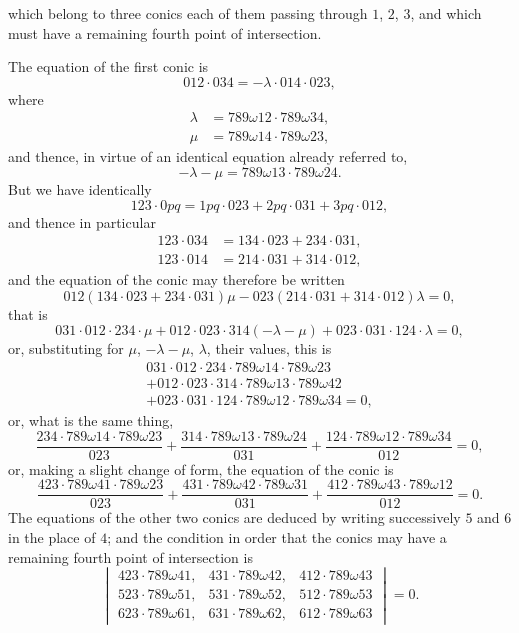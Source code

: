 \documentclass[11pt,a4paper]{book}
\begin{document}
\newpage
\setcounter{page}{502}

which belong to three conics each of them passing through $1$, $2$, $3$, and which must have a remaining fourth point of intersection.

The equation of the first conic is
\[
012 \cdot 034 = -\lambda \cdot 014 \cdot 023,
\]
where
\begin{align*}
\lambda &= 789\omega 12 \cdot 789\omega 34,\\
\mu &= 789\omega 14 \cdot 789\omega 23,
\end{align*}
and thence, in virtue of an identical equation already referred to,
\[
-\lambda - \mu = 789\omega 13 \cdot 789\omega 24.
\]
But we have identically
\[
123 \cdot 0pq = 1pq \cdot 023 + 2pq \cdot 031 + 3pq \cdot 012,
\]
and thence in particular
\begin{align*}
123 \cdot 034 &= 134 \cdot 023 + 234 \cdot 031,\\
123 \cdot 014 &= 214 \cdot 031 + 314 \cdot 012,
\end{align*}
and the equation of the conic may therefore be written
\[
012 (134 \cdot 023 + 234 \cdot 031)\mu - 023 (214 \cdot 031 + 314 \cdot 012)\lambda = 0,
\]
that is
\[
031 \cdot 012 \cdot 234 \cdot \mu + 012 \cdot 023 \cdot 314(-\lambda-\mu) + 023 \cdot 031 \cdot 124 \cdot \lambda = 0,
\]
or, substituting for $\mu$, $-\lambda-\mu$, $\lambda$, their values, this is
\begin{multline*}
031 \cdot 012 \cdot 234 \cdot 789\omega 14 \cdot 789\omega 23\\
+ 012 \cdot 023 \cdot 314 \cdot 789\omega 13 \cdot 789\omega 42\\
+ 023 \cdot 031 \cdot 124 \cdot 789\omega 12 \cdot 789\omega 34 = 0,
\end{multline*}
or, what is the same thing,
\[
\frac{234 \cdot 789\omega 14 \cdot 789\omega 23}{023}
+ \frac{314 \cdot 789\omega 13 \cdot 789\omega 24}{031}
+ \frac{124 \cdot 789\omega 12 \cdot 789\omega 34}{012} = 0,
\]
or, making a slight change of form, the equation of the conic is
\[
\frac{423 \cdot 789\omega 41 \cdot 789\omega 23}{023}
+ \frac{431 \cdot 789\omega 42 \cdot 789\omega 31}{031}
+ \frac{412 \cdot 789\omega 43 \cdot 789\omega 12}{012} = 0.
\]
The equations of the other two conics are deduced by writing successively $5$ and $6$ in the place of $4$; and the condition in order that the conics may have a remaining fourth point of intersection is
\[
\begin{vmatrix}
423 \cdot 789\omega 41, & 431 \cdot 789\omega 42, & 412 \cdot 789\omega 43\\
523 \cdot 789\omega 51, & 531 \cdot 789\omega 52, & 512 \cdot 789\omega 53\\
623 \cdot 789\omega 61, & 631 \cdot 789\omega 62, & 612 \cdot 789\omega 63
\end{vmatrix}
= 0.
\]
\end{document}
